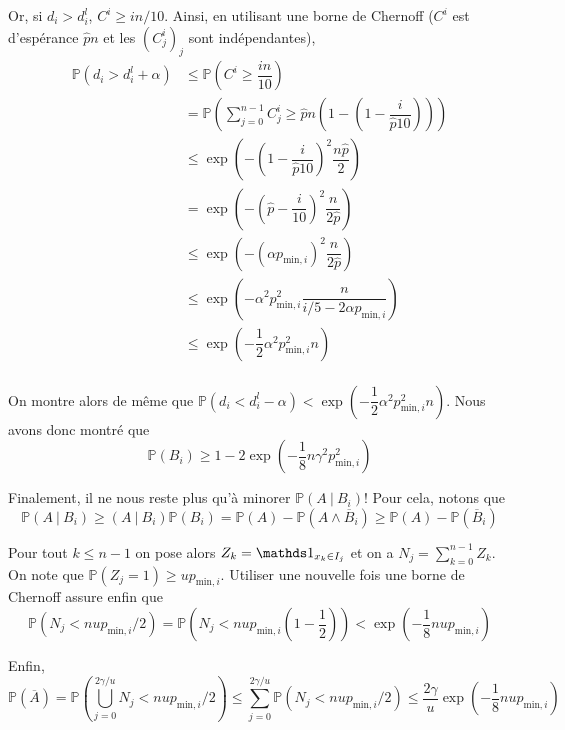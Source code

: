 Or, si \(d_i > d_i^l\), \(C^i \geq in/10\). Ainsi, en utilisant une borne de {\sc Chernoff} (\(C^i\) est d'espérance \(\hat pn\) et les \((C^i_j)_j\) sont indépendantes),
\begin{align*}
    \mathbb P\left( d_i > d_i^l + \alpha \right)& \leq \mathbb P \left( C^i \geq \dfrac{in}{10}\right)\\
    & = \mathbb P \left( \sum_{j = 0}^{n-1}C^i_j \geq \hat pn\left( 1 - \left(1 - \dfrac{i}{\hat p 10}\right)\right)\right)\\
    & \leq \exp\left( -\left(1 - \dfrac{i}{\hat p 10}\right)^2\dfrac{n\hat p}{2}\right)\\
    & = \exp\left( -\left(\hat p - \dfrac{i}{10}\right)^2\dfrac{n}{2\hat p}\right)\\
    & \leq \exp\left( -\left(\alpha p_{\text{min}, i}\right)^2\dfrac{n}{2\hat p}\right)\\
    & \leq \exp\left( -\alpha^2 p_{\text{min}, i}^2\dfrac{n}{i/5 - 2\alpha p_{\text{min}, i}}\right)\\
    & \leq \exp\left( -\dfrac{1}{2}\alpha^2 p_{\text{min}, i}^2n\right)\\
\end{align*}

On montre alors de même que \(\mathbb P\left( d_i < d_i^l - \alpha \right) < \exp\left( -\dfrac{1}{2}\alpha^2 p_{\text{min}, i}^2n\right)\). Nous avons donc montré que 
\[
    \mathbb P \left( B_i \right) \geq 1 - 2\exp\left( -\dfrac{1}{8}n\gamma^2 p_{\text{min}, i}^2\right)
\]

Finalement, il ne nous reste plus qu'à minorer \(\mathbb P (A\ | \ B_i)\)! Pour cela, notons que 
\[
    \mathbb P (A\ | \ B_i) \geq (A\ | \ B_i)\mathbb P(B_i) = \mathbb P (A) - \mathbb P \left( A \wedge \overline B_i \right) \geq \mathbb P (A) - \mathbb P (\overline B_i)
\]

Pour tout \(k \leq n - 1\) on pose alors \(Z_k = \un_{x_k \in I_j}\) et on a \(N_j = \sum_{k = 0}^{n-1} Z_k\). On note que \(\mathbb P (Z_j = 1) \geq u p_{\text{min}, i}\). Utiliser une nouvelle fois une borne de {\sc Chernoff} assure enfin que 
\[
    \mathbb P \left( N_j < n u p_{\text{min}, i}/2\right) = \mathbb P \left( N_j < n u p_{\text{min}, i} \left( 1 - \dfrac{1}{2} \right)\right) < \exp\left( - \dfrac{1}{8}n u p_{\text{min}, i} \right)
\]

Enfin,
\[
  \mathbb P \left( \overline A \right)  = \mathbb P \left( \bigcup_{j = 0}^{2\gamma /u} N_j < n u p_{\text{min}, i}/2  \right) \leq \sum_{j = 0}^{2\gamma/u} \mathbb P \left( N_j < n u p_{\text{min}, i}/2 \right) \leq \dfrac{2\gamma}{u}\exp\left( - \dfrac{1}{8}n u p_{\text{min}, i} \right)
\]



